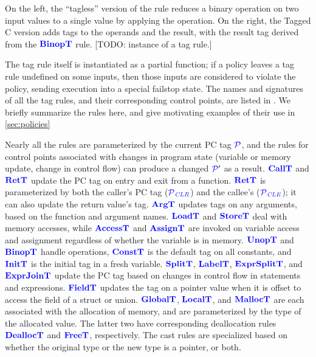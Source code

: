 \documentclass{llncs}
\begin{document}
\begin{minipage}[t]{0.37\textwidth}
  \binopsteptagless
\end{minipage}
\begin{minipage}[t]{0.6\textwidth}
  \binopstep
\end{minipage}

\noindent
On the left, the ``tagless'' version of the rule reduces a
binary operation on two input values to a single value by applying the operation.
On the right, the Tagged C version adds tags to the operands and the result, with the result tag
derived from the \(\binoptname\) rule. [TODO: instance of a tag rule.]

The tag rule itself is instantiated as a partial function; if a policy leaves a tag rule
undefined on some inputs, then those inputs are considered to violate the policy, sending
execution into a special failstop state. The names and signatures of all the tag rules,
and their corresponding control points, are listed in .
We briefly summarize the rules here, and give motivating examples of their use in \cref{sec:policies}

Nearly all the rules are parameterized by the current PC tag \(\PCT\), and the rules
for control points associated with changes in program state (variable or memory update,
change in control flow) can produce a changed \(\PCT'\) as a result.
\(\calltname\) 
and \(\rettname\) update the PC tag on entry and exit from a function.
\(\rettname\) is parameterized by both the caller's PC tag (\(\PCT[_{\color{blue} CLR}]\))
and the callee's (\(\PCT[_{\color{blue} CLE}]\)); it can also update the return value's tag.
\(\argtname\) updates tags on any arguments, based on the function and argument names.
\(\loadtname\) and \(\storetname\) deal with memory accesses, while \(\accesstname\) and
\(\assigntname\) are invoked on variable access and assignment regardless of whether the variable
is in memory.
\(\unoptname\) and \(\binoptname\) handle operations, \(\consttname\) is the default tag
on all constants, and \(\inittname\) is the initial tag in a fresh variable.
\(\splittname\), \(\labeltname\), \(\exprsplittname\), and \(\exprjointname\) 
update the PC tag based on changes in control flow in statements and expressions.
\(\fieldtname\) updates the tag on a pointer value when it is offset to access the field of a struct or union.
 \(\globaltname\), \(\localtname\),
 and \(\malloctname\) are each associated with the allocation of memory, and are
 parameterized by the type of the allocated value. The latter
two have corresponding deallocation rules \(\dealloctname\) and \(\freetname\),
respectively. The cast rules are specialized based on whether the original type or
the new type is a pointer, or both.
\end{document}
